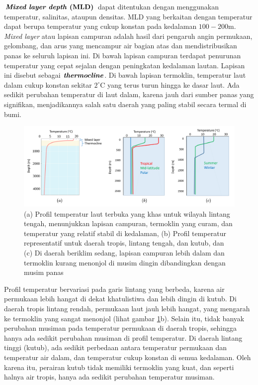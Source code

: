 \begin{spacing}{1.5}
	$\textbf{\textit{Mixed layer depth} (MLD)}$ dapat ditentukan dengan menggunakan temperatur, salinitas, ataupun densitas. MLD yang berkaitan dengan temperatur dapat berupa temperatur yang cukup konstan pada kedalaman $100 - 200$m. \textit{Mixed layer} atau lapisan campuran adalah hasil dari pengaruh angin permukaan, gelombang, dan arus yang mencampur air bagian atas dan mendistribusikan panas ke seluruh lapisan ini. Di bawah lapisan campuran terdapat penurunan temperatur yang cepat sejalan dengan peningkatan kedalaman lautan. Lapisan ini disebut sebagai $\textbf{\textit{thermocline}}$. Di bawah lapisan termoklin, temperatur laut dalam cukup konstan sekitar $2^\circ$C yang terus turun hingga ke dasar laut. Ada sedikit perubahan temperatur di laut dalam, karena jauh dari sumber panas yang signifikan, menjadikannya salah satu daerah yang paling stabil secara termal di bumi.
	\begin{figure}[H]
		\centering
		\includegraphics[width=15cm]{contents/mld_theory}
		\caption{(a) Profil temperatur laut terbuka yang khas untuk wilayah lintang tengah, menunjukkan lapisan campuran, termoklin yang curam, dan temperatur yang relatif stabil di kedalaman, (b) Profil temperatur representatif untuk daerah tropis, lintang tengah, dan kutub, dan (c) Di daerah beriklim sedang, lapisan campuran lebih dalam dan termoklin kurang menonjol di musim dingin dibandingkan dengan musim panas  \protect{}}
		\label{fig:mld_theory}
	\end{figure}
	 Profil temperatur bervariasi pada garis lintang yang berbeda, karena air permukaan lebih hangat di dekat khatulistiwa dan lebih dingin di kutub. Di daerah tropis lintang rendah, permukaan laut jauh lebih hangat, yang mengarah ke termoklin yang sangat menonjol (lihat gambar \ref{fig:mld_theory}b). Selain itu, tidak banyak perubahan musiman pada temperatur permukaan di daerah tropis, sehingga hanya ada sedikit perubahan musiman di profil temperatur. Di daerah lintang tinggi (kutub), ada sedikit perbedaan antara temperatur permukaan dan temperatur air dalam, dan temperatur cukup konstan di semua  kedalaman. Oleh karena itu, perairan kutub tidak memiliki termoklin yang kuat, dan seperti halnya air tropis, hanya ada sedikit perubahan temperatur musiman. 
	 

\end{spacing}
